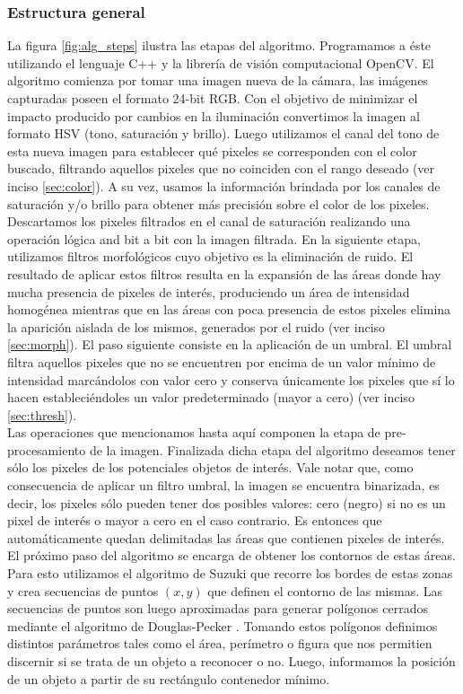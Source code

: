 \subsubsection{Estructura general}
La figura \ref{fig:alg_steps} ilustra las etapas del algoritmo. 
Programamos a \'este utilizando el lenguaje C++ y la librer\'ia de 
visi\'on computacional OpenCV.
El algoritmo comienza por tomar una imagen nueva de la c\'amara, las 
im\'agenes capturadas poseen el formato 24-bit RGB. Con el objetivo de 
minimizar el impacto producido por cambios en la iluminaci\'on 
convertimos la imagen al formato HSV (tono, saturaci\'on y brillo). Luego 
utilizamos el canal del tono de esta nueva imagen para establecer qu\'e 
pixeles se corresponden con el color buscado, filtrando aquellos 
pixeles que no coinciden con el rango deseado (ver inciso 
\ref{sec:color}). A su vez, usamos la informaci\'on brindada por los  canales de saturaci\'on y/o brillo para obtener m\'as precisi\'on sobre el color de los pixeles.\\
	\indent Descartamos los pixeles filtrados en el canal de saturaci\'on 
	realizando una operaci\'on l\'ogica and bit a bit con la imagen filtrada.  En la siguiente 
	etapa, utilizamos filtros morfol\'ogicos cuyo objetivo es la 
	eliminaci\'on de ruido. El resultado de aplicar estos filtros resulta 
	en la expansi\'on de las \'areas donde hay mucha presencia de pixeles de 
	inter\'es, produciendo un \'area de intensidad homog\'enea mientras que 
	en las \'areas con poca presencia de estos pixeles 
	elimina la aparici\'on aislada de los mismos, generados por el ruido (ver 
	inciso \ref{sec:morph}). El paso 
	siguiente consiste en la aplicaci\'on de un umbral. El umbral filtra 
	aquellos pixeles que no se encuentren por encima de un valor m\'inimo 
	de intensidad marc\'andolos con valor cero y conserva \'unicamente los 
	pixeles que s\'i lo hacen estableci\'endoles un valor predeterminado 
	(mayor a cero) (ver inciso \ref{sec:thresh}). \\
	\indent Las operaciones que mencionamos hasta aqu\'i componen la 
	etapa de  pre-procesamiento de la imagen. Finalizada dicha etapa del 
	algoritmo deseamos tener s\'olo los pixeles de los potenciales objetos de 
	inter\'es. Vale notar que, como consecuencia de aplicar un filtro 
	umbral, la imagen se encuentra binarizada, es decir, los pixeles s\'olo 
	pueden tener dos posibles valores: cero (negro) si no es un pixel de 
	inter\'es o mayor a cero en el caso contrario. Es entonces que 
	autom\'aticamente quedan delimitadas las \'areas que contienen pixeles 
	de inter\'es. El pr\'oximo paso del algoritmo se encarga de obtener los 
	contornos de estas \'areas. Para esto utilizamos el algoritmo de Suzuki 
	\cite{suzuki85} que recorre los bordes de estas zonas y crea 
	secuencias de puntos $(x,y)$ que definen el contorno de las mismas. 
	Las secuencias de puntos son luego aproximadas para generar pol\'igonos 
	cerrados mediante el algoritmo de Douglas-Pecker \cite{dp74}. Tomando 
	estos pol\'igonos definimos distintos par\'ametros tales como el \'area, 
	per\'imetro o figura que nos permitien discernir si se trata de un objeto 
	a reconocer o no. Luego, informamos la posici\'on de un objeto a 
	partir de su rect\'angulo contenedor m\'inimo.



